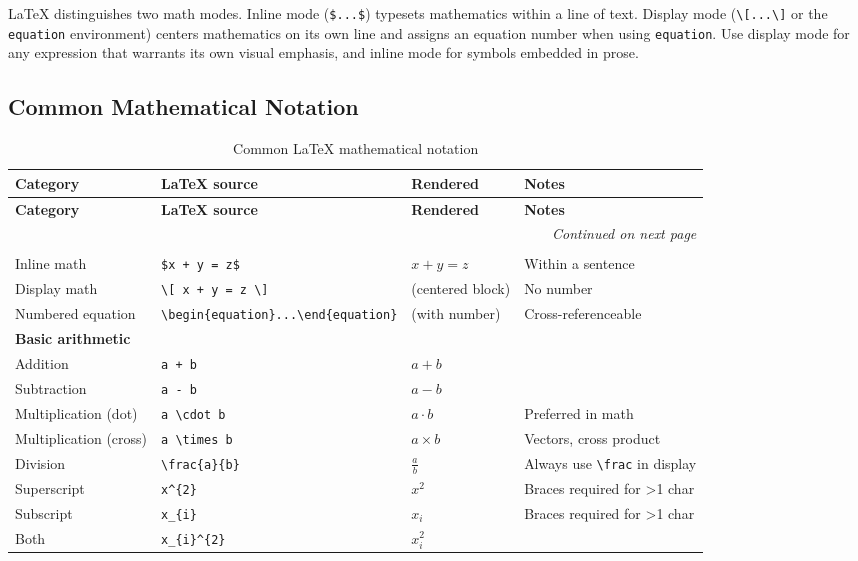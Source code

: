 \LaTeX{} distinguishes two math modes. Inline mode (\verb|$...$|)
typesets mathematics within a line of text. Display mode
(\verb|\[...\]| or the \texttt{equation} environment) centers
mathematics on its own line and assigns an equation number when using
\texttt{equation}. Use display mode for any expression that warrants
its own visual emphasis, and inline mode for symbols embedded in
prose.

\subsection{Common Mathematical Notation}

\begin{longtable}{p{3.2cm} p{4.5cm} p{3.0cm} p{3.5cm}}
\caption{Common \LaTeX{} mathematical notation} \label{tab:latex-math-cheatsheet} \\
\toprule
\textbf{Category} & \textbf{\LaTeX{} source} & \textbf{Rendered} & \textbf{Notes} \\
\midrule
\endfirsthead
\toprule
\textbf{Category} & \textbf{\LaTeX{} source} & \textbf{Rendered} & \textbf{Notes} \\
\midrule
\endhead
\midrule
\multicolumn{4}{r}{\emph{Continued on next page}} \\
\endfoot
\bottomrule
\endlastfoot

\multicolumn{4}{l}{\textbf{Inline and display modes}} \\
\midrule
Inline math & \verb|$x + y = z$| & $x + y = z$ & Within a sentence \\
Display math & \verb|\[ x + y = z \]| & (centered block) & No number \\
Numbered equation & \verb|\begin{equation}...\end{equation}| & (with number) & Cross-referenceable \\
\midrule

\multicolumn{4}{l}{\textbf{Basic arithmetic}} \\
\midrule
Addition & \verb|a + b| & $a+b$ & \\
Subtraction & \verb|a - b| & $a-b$ & \\
Multiplication (dot) & \verb|a \cdot b| & $a \cdot b$ & Preferred in math \\
Multiplication (cross) & \verb|a \times b| & $a \times b$ & Vectors, cross product \\
Division & \verb|\frac{a}{b}| & $\frac{a}{b}$ & Always use \verb|\frac| in display \\
Superscript & \verb|x^{2}| & $x^{2}$ & Braces required for >1 char \\
Subscript & \verb|x_{i}| & $x_{i}$ & Braces required for >1 char \\
Both & \verb|x_{i}^{2}| & $x_{i}^{2}$ & \\
\midrule


\end{longtable}
